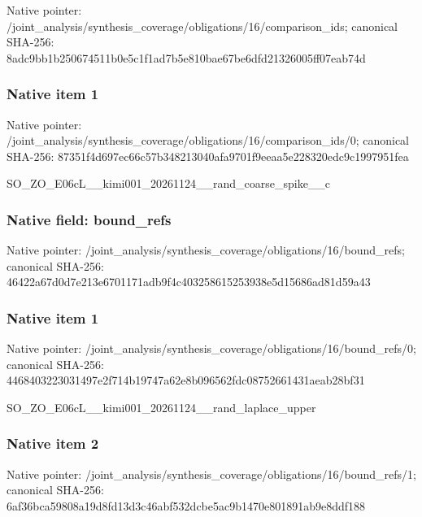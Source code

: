 \documentclass[10pt,a4paper]{article}
\begin{document}
Native pointer: /joint\_analysis/synthesi\allowbreak{}s\_coverage/obligations/1\allowbreak{}6/comparison\_ids; canonical SHA-256: 8adc9bb1b250674511b0e5c1\allowbreak{}f1ad7b5e810bae67be6dfd21\allowbreak{}326005ff07eab74d



\subsubsection{Native item 1}


Native pointer: /joint\_analysis/synthesi\allowbreak{}s\_coverage/obligations/1\allowbreak{}6/comparison\_ids/0; canonical SHA-256: 87351f4d697ec66c57b34821\allowbreak{}3040afa9701f9eeaa5e22832\allowbreak{}0edc9c1997951fea


SO\_ZO\_E06cL\_\_kimi001\_202\allowbreak{}61124\_\_rand\_coarse\_spike\allowbreak{}\_\_c


\subsubsection{Native field: bound\_refs}


Native pointer: /joint\_analysis/synthesi\allowbreak{}s\_coverage/obligations/1\allowbreak{}6/bound\_refs; canonical SHA-256: 46422a67d0d7e213e6701171\allowbreak{}adb9f4c403258615253938e5\allowbreak{}d15686ad81d59a43



\subsubsection{Native item 1}


Native pointer: /joint\_analysis/synthesi\allowbreak{}s\_coverage/obligations/1\allowbreak{}6/bound\_refs/0; canonical SHA-256: 4468403223031497e2f714b1\allowbreak{}9747a62e8b096562fdc08752\allowbreak{}661431aeab28bf31


SO\_ZO\_E06cL\_\_kimi001\_202\allowbreak{}61124\_\_rand\_laplace\_uppe\allowbreak{}r


\subsubsection{Native item 2}


Native pointer: /joint\_analysis/synthesi\allowbreak{}s\_coverage/obligations/1\allowbreak{}6/bound\_refs/1; canonical SHA-256: 6af36bca59808a19d8fd13d3\allowbreak{}c46abf532dcbe5ac9b1470e8\allowbreak{}01891ab9e8ddf188
\end{document}
